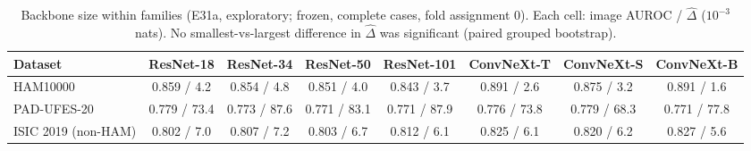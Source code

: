 \begin{table}[tp]\centering\footnotesize
\caption{Backbone size within families (E31a, exploratory; frozen, complete cases, fold assignment 0). Each cell: image AUROC / $\hat\Delta$ ($10^{-3}$ nats). No smallest-vs-largest difference in $\hat\Delta$ was significant (paired grouped bootstrap).}\label{tab:family}
\setlength{\tabcolsep}{3pt}
\begin{tabular}{lccccccc}\toprule
Dataset & ResNet-18 & ResNet-34 & ResNet-50 & ResNet-101 & ConvNeXt-T & ConvNeXt-S & ConvNeXt-B\\\midrule
HAM10000 & 0.859 / 4.2 & 0.854 / 4.8 & 0.851 / 4.0 & 0.843 / 3.7 & 0.891 / 2.6 & 0.875 / 3.2 & 0.891 / 1.6\\
PAD-UFES-20 & 0.779 / 73.4 & 0.773 / 87.6 & 0.771 / 83.1 & 0.771 / 87.9 & 0.776 / 73.8 & 0.779 / 68.3 & 0.771 / 77.8\\
ISIC 2019 (non-HAM) & 0.802 / 7.0 & 0.807 / 7.2 & 0.803 / 6.7 & 0.812 / 6.1 & 0.825 / 6.1 & 0.820 / 6.2 & 0.827 / 5.6\\
\bottomrule\end{tabular}\end{table}
